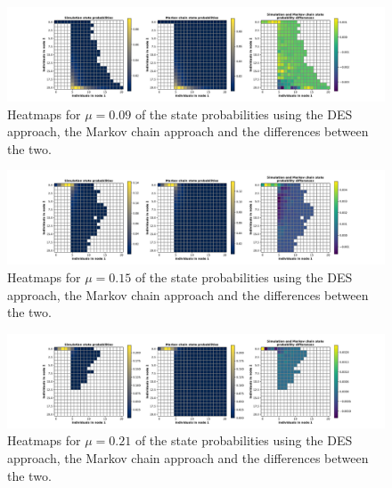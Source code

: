 \begin{figure}[H]
    \includegraphics[width=\textwidth, trim=100 10 100 10, clip]{chapters/03_queueing_model/Bin/numeric_results_and_timings/steady_state_probabilities/main_3.pdf}
    \caption{Heatmaps for \(\mu = 0.09\) of the state probabilities using the
    DES approach, the Markov chain approach and the differences between the
    two.}
    \label{fig:comparison_steady_state_probabilities_2}
\end{figure}

\begin{figure}[H]
    \includegraphics[width=\textwidth, trim=100 10 100 10, clip]{chapters/03_queueing_model/Bin/numeric_results_and_timings/steady_state_probabilities/main_5.pdf}
    \caption{Heatmaps for \(\mu = 0.15\) of the state probabilities using the
    DES approach, the Markov chain approach and the differences between the
    two.}
    \label{fig:comparison_steady_state_probabilities_3}
\end{figure}

\begin{figure}[H]
    \includegraphics[width=\textwidth, trim=100 10 100 10, clip]{chapters/03_queueing_model/Bin/numeric_results_and_timings/steady_state_probabilities/main_7.pdf}
    \caption{Heatmaps for \(\mu = 0.21\) of the state probabilities using the
    DES approach, the Markov chain approach and the differences between the
    two.}
    \label{fig:comparison_steady_state_probabilities_4}
\end{figure}

